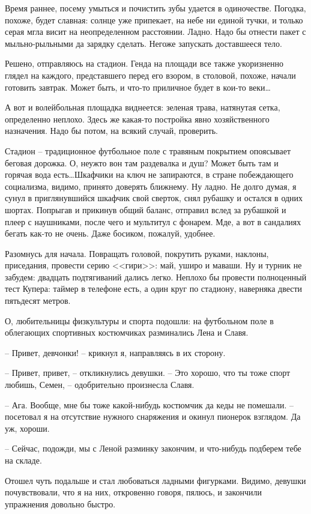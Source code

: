 \documentclass[a4paper]{book}
\begin{document}
Время раннее, посему умыться и почистить зубы удается в одиночестве. Погодка, похоже, будет славная: солнце уже припекает, на небе ни единой тучки, и только серая мгла висит на неопределенном расстоянии. Ладно. Надо бы отнести пакет с мыльно-рыльными да зарядку сделать. Негоже запускать доставшееся тело.

Решено, отправляюсь на стадион. Генда на площади все также укоризненно глядел на каждого, представшего перед его взором, в столовой, похоже, начали готовить завтрак. Может быть, и что-то приличное будет в кои-то веки\ldots 

А вот и волейбольная площадка виднеется: зеленая трава, натянутая сетка, определенно неплохо. Здесь же какая-то постройка явно хозяйственного назначения. Надо бы потом, на всякий случай, проверить. 

Стадион -- традиционное футбольное поле с травяным покрытием опоясывает беговая дорожка.  О, неужто вон там раздевалка и душ? Может быть там и горячая вода есть\ldots Шкафчики на ключ не запираются, в стране побеждающего социализма, видимо, принято доверять ближнему. Ну ладно. Не долго думая, я сунул в приглянувшийся шкафчик свой сверток, снял рубашку и остался в одних шортах. Попрыгав и прикинув общий баланс, отправил вслед за рубашкой и плеер с наушниками, после чего и мультитул с фонарем. Мде, а вот в сандалиях бегать как-то не очень.  Даже босиком, пожалуй, удобнее.

Разомнусь для начала. Повращать головой, покрутить руками, наклоны, приседания, провести серию <<гири>>: май, уширо и маваши. Ну и турник не забудем: двадцать подтягиваний дались легко. Неплохо бы провести полноценный тест Купера: таймер в телефоне есть, а один круг по стадиону, наверняка двести пятьдесят метров. 

О, любительницы физкультуры и спорта подошли: на футбольном поле в облегающих спортивных костюмчиках разминались Лена и Славя. 

-- Привет, девчонки! -- крикнул я, направляясь в их сторону. 

-- Привет, привет, -- откликнулись девушки. -- Это хорошо, что ты тоже спорт любишь, Семен, -- одобрительно произнесла Славя.

-- Ага. Вообще, мне бы тоже какой-нибудь костюмчик да кеды не помешали. -- посетовал я на отсутствие нужного снаряжения и окинул пионерок взглядом. Да уж, хороши.

-- Сейчас, подожди, мы с Леной разминку закончим, и что-нибудь подберем тебе на складе.

Отошел чуть подальше и стал любоваться ладными фигурками. Видимо, девушки почувствовали, что я на них, откровенно говоря, пялюсь, и закончили упражнения довольно быстро.
\end{document}
